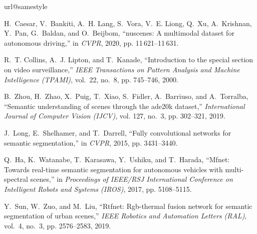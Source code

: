 \documentclass[10.5pt,twocolumn,journal,letterpaper]{IEEEtran}
\begin{document}
\begin{thebibliography}{10}
	\providecommand{\url}[1]{#1}
	\csname url@samestyle\endcsname
	\providecommand{\newblock}{\relax}
	\providecommand{\bibinfo}[2]{#2}
	\providecommand{\BIBentrySTDinterwordspacing}{\spaceskip=0pt\relax}
	\providecommand{\BIBentryALTinterwordstretchfactor}{4}
	\providecommand{\BIBentryALTinterwordspacing}{\spaceskip=\fontdimen2\font plus
		\BIBentryALTinterwordstretchfactor\fontdimen3\font minus
		\fontdimen4\font\relax}
	\providecommand{\BIBforeignlanguage}[2]{{\expandafter\ifx\csname l@#1\endcsname\relax
			\typeout{** WARNING: IEEEtran.bst: No hyphenation pattern has been}\typeout{** loaded for the language `#1'. Using the pattern for}\typeout{** the default language instead.}\else
			\language=\csname l@#1\endcsname
			\fi
			#2}}
	\providecommand{\BIBdecl}{\relax}
	\BIBdecl
	
	H.~Caesar, V.~Bankiti, A.~H. Lang, S.~Vora, V.~E. Liong, Q.~Xu, A.~Krishnan,
	Y.~Pan, G.~Baldan, and O.~Beijbom, ``nuscenes: A multimodal dataset for
	autonomous driving,'' in \emph{CVPR}, 2020, pp. 11\,621--11\,631.
	
	R.~T. Collins, A.~J. Lipton, and T.~Kanade, ``Introduction to the special
	section on video surveillance,'' \emph{IEEE Transactions on Pattern Analysis
		and Machine Intelligence (TPAMI)}, vol.~22, no.~8, pp. 745--746, 2000.
	
	B.~Zhou, H.~Zhao, X.~Puig, T.~Xiao, S.~Fidler, A.~Barriuso, and A.~Torralba,
	``Semantic understanding of scenes through the ade20k dataset,''
	\emph{International Journal of Computer Vision (IJCV)}, vol. 127, no.~3, pp.
	302--321, 2019.
	
	J.~Long, E.~Shelhamer, and T.~Darrell, ``Fully convolutional networks for
	semantic segmentation,'' in \emph{CVPR}, 2015, pp. 3431--3440.
	
	Q.~Ha, K.~Watanabe, T.~Karasawa, Y.~Ushiku, and T.~Harada, ``Mfnet: Towards
	real-time semantic segmentation for autonomous vehicles with multi-spectral
	scenes,'' in \emph{Proceedings of IEEE/RSJ International Conference on
		Intelligent Robots and Systems (IROS)}, 2017, pp. 5108--5115.
	
	Y.~Sun, W.~Zuo, and M.~Liu, ``Rtfnet: Rgb-thermal fusion network for semantic
	segmentation of urban scenes,'' \emph{IEEE Robotics and Automation Letters
		(RAL)}, vol.~4, no.~3, pp. 2576--2583, 2019.
	

\end{thebibliography}
\end{document}
